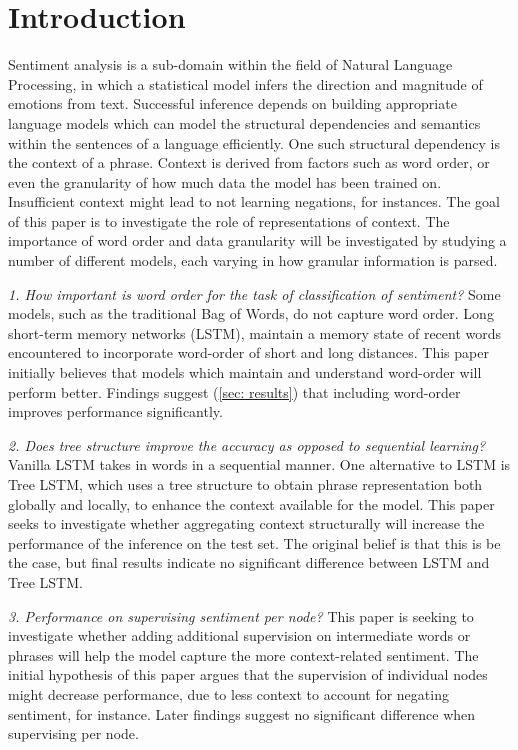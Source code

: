\section{Introduction}
\label{sec: intro}
Sentiment analysis is a sub-domain within the field of Natural Language
Processing, in which a statistical model infers the direction and magnitude of
emotions from text. Successful inference depends on building appropriate
language models which can model the structural dependencies and semantics within
the sentences of a language efficiently. One such structural dependency is the
context of a phrase. Context is derived from factors such as word order, or even
the granularity of how much data the model has been trained on. Insufficient
context might lead to not learning negations, for instances. The goal of this
paper is to investigate the role of representations of context. The importance
of word order and data granularity will be investigated by studying a number of
different models, each varying in how granular information is parsed.

    \textit{1. How important is word order for the task of classification of
    sentiment?} Some models, such as the traditional Bag of Words, do not
    capture word order. Long short-term memory networks (LSTM), maintain a
    memory state of recent words encountered to incorporate word-order of short
    and long distances. This paper initially believes that models which maintain
    and understand word-order will perform better. Findings suggest (\ref{sec:
    results}) that including word-order improves performance significantly.

    \textit{2. Does tree structure improve the accuracy as opposed to sequential
    learning?} Vanilla LSTM takes in words in a sequential manner. One
    alternative to LSTM is Tree LSTM, which uses a tree structure to obtain
    phrase representation both globally and locally, to enhance the context
    available for the model. This paper seeks to investigate whether aggregating
    context structurally will increase the performance of the inference on the
    test set. The original belief is that this is be the case, but final results
    indicate no significant difference between LSTM and Tree LSTM.
    
    \textit{3. Performance on supervising sentiment per node?}
    This paper is seeking to investigate whether adding additional supervision
    on intermediate words or phrases will help the model capture the more
    context-related sentiment. The initial hypothesis of this paper argues that the
    supervision of individual nodes might decrease performance, due to less context
    to account for negating sentiment, for instance. Later findings suggest no
    significant difference when supervising per node.

